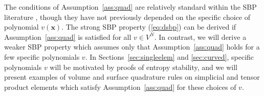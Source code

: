 \documentclass{svjour3}                     %
\renewcommand{\hat}{\widehat}
\newcommand{\pd}[2]{\frac{\partial#1}{\partial#2}}
\begin{document}
The conditions of Assumption~\ref{ass:quad} are relatively standard within the SBP literature \cite{hicken2016multidimensional, chan2017discretely, crean2018entropy}, though they have not previously depended on the specific choice of polynomial $v(\bm{x})$.   The strong SBP property (\ref{eq:dsbp}) can be derived if Assumption~\ref{ass:quad} is satisfied for all $v \in V^N$.  In contrast, we will derive a weaker SBP property which assumes only that Assumption~\ref{ass:quad} holds for a few specific polynomials $v$.  In Sections~\ref{sec:singleelem} and \ref{sec:curved}, specific polynomials $v$ will be motivated by proofs of entropy stability, and we will present examples of volume and surface quadrature rules on simplicial and tensor product elements which satisfy Assumption~\ref{ass:quad} for these choices of $v$.  

\end{document}

